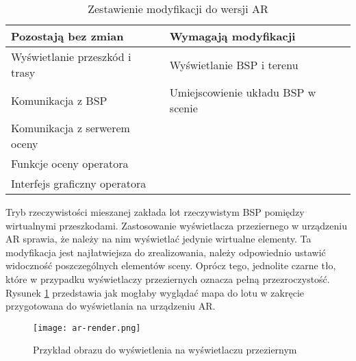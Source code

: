 \begin{table}[!h] \centering
    \caption{Zestawienie modyfikacji do wersji AR}
    \label{tab:modyfikacje-ar}

    \begin{tabular} {| l | l |} \hline
        \textbf{Pozostają bez zmian} & \textbf{Wymagają modyfikacji} \\ \hline\hline
        Wyświetlanie przeszkód i trasy & Wyświetlanie BSP i terenu \\ \hline
        Komunikacja z BSP & Umiejscowienie układu BSP w scenie \\ \hline
        Komunikacja z serwerem oceny &  \\ \hline
        Funkcje oceny operatora &  \\ \hline
        Interfejs graficzny operatora &  \\ \hline
    \end{tabular}
\end{table}

Tryb rzeczywistości mieszanej zakłada lot rzeczywistym BSP pomiędzy wirtualnymi przeszkodami. Zastosowanie wyświetlacza przeziernego w urządzeniu AR sprawia, że należy na nim wyświetlać jedynie wirtualne elementy. Ta modyfikacja jest najłatwiejsza do zrealizowania, należy odpowiednio ustawić widoczność poszczególnych elementów sceny. Oprócz tego, jednolite czarne tło, które w przypadku wyświetlaczy przeziernych oznacza pełną przezroczystość. Rysunek \ref{fig:ar-render} przedstawia jak mogłaby wyglądać mapa do lotu w zakręcie przygotowana do wyświetlania na urządzeniu AR.

\begin{figure}[!h]
    \centering \texttt{[image: ar-render.png]}
    \caption{Przykład obrazu do wyświetlenia na wyświetlaczu przeziernym}
    \label{fig:ar-render}
\end{figure}

